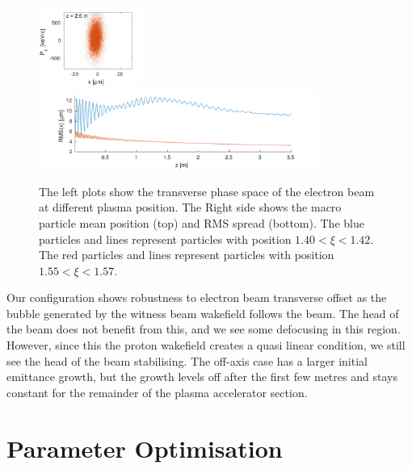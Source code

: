 \documentclass[aps,prstab,reprint,amsmath,amssymb,groupedaddress]{revtex4-1}
\begin{document}
\begin{figure}[hbt]
    \includegraphics[height=26.0mm,trim={16mm 0.1mm  0mm 2mm},clip]{figures/beamFilamentation06}
    \includegraphics[height=26.0mm,trim={10mm 0.1mm 15mm 2mm},clip]{figures/beamOffsetRMS}
    \caption{\label{Fig:BeamFilament} The left plots show the transverse phase space of the electron beam at different
        plasma position. The Right side shows the macro particle mean position (top) and RMS spread (bottom). The blue
        particles and lines represent particles with position $1.40 < \xi < 1.42$. The red particles and lines
        represent particles with position $1.55 < \xi < 1.57$.}
\end{figure}

Our configuration shows robustness to electron beam transverse offset as the bubble generated by the witness beam
wakefield follows the beam. The head of the beam does not benefit from this, and we see some defocusing in this region.
However, since this the proton wakefield creates a quasi linear condition, we still see the head of the beam
stabilising. The off-axis case has a larger initial emittance growth, but the growth levels off after the first few
metres and stays constant for the remainder of the plasma accelerator section.




\section[\label{S:PO}]{Parameter Optimisation}
\end{document}

